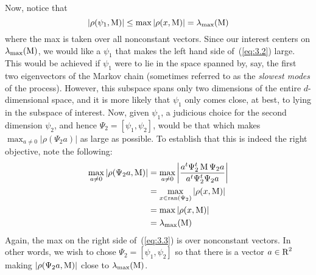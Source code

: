 Now, notice that
\begin{equation}
  \label{eq:3.2}
|\rho(\psi_1,\operatorname{M})| \leq \max |\rho(x,\operatorname{M})| = \lambda_{\max}(\operatorname{M})
\end{equation}
where the max is taken over all nonconstant vectors. Since our interest 
centers on 
$\lambda_{\max}(\operatorname{M})$, 
we would like a $\psi_1$ that makes the left hand side of~(\ref{eq:3.2}) large. 
This would be achieved if $\psi_1$ were to lie in the space spanned by, say, the
first two eigenvectors of the Markov chain (sometimes referred 
to as the \emph{slowest modes} of the process). However, this subspace spans
only two dimensions of the entire $d$-dimensional space, and it is more likely
that $\psi_1$ only comes close, at best, to lying in the subspace of
interest. Now, given $\psi_1$, a judicious choice for the second dimension $\psi_2$, and
hence $\Psi_2 = [\psi_1, \psi_2]$, would be that which makes 
$\max_{a\neq 0} |\rho(\Psi_2 a)|$ as large as possible. To establish that 
this is indeed the right objective, note the following:
\begin{align}
\label{eq:3.3}
\max_{a\neq 0}|\rho(\Psi_2a,\operatorname{M})| &= \max_{a\neq 0} \left|\frac{a^t \Psi^t_2 \operatorname{M} \Psi_2 a}{a^t \Psi^t_2 \Psi_2 a}\right|\nonumber\\
&= \max_{x\in \operatorname{ran}(\Psi_2)}|\rho(x,\operatorname{M})|\nonumber\\
&= \max|\rho(x,\operatorname{M})|\\
&= \lambda_{\max}(\operatorname{M})\nonumber
\end{align}
Again, the max on the right side of~(\ref{eq:3.3}) is over nonconstant vectors. 
In other words, we wish to chose
$\Psi_2 = [\psi_1, \psi_2]$ so that there is a vector $a \in \operatorname{R}^2$ making 
$|\rho(\Psi_2 a,\operatorname{M})|$ close to $\lambda_{\max}(\operatorname{M})$.

